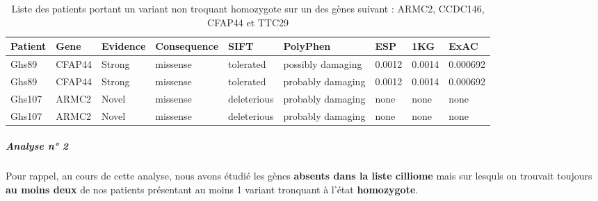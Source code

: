 \documentclass[12pt,twoside]{reedthesis}
\theoremstyle{definition}
\theoremstyle{definition}
\theoremstyle{remark}
\begin{document}
  \begin{longtable}[t]{lllllllll}
  \caption{\label{tab:tabgrp1moderate}Liste des patients portant un variant non troquant homozygote sur un des gènes suivant : ARMC2, CCDC146, CFAP44  et  TTC29}\\
  \toprule
  Patient & Gene & Evidence & Consequence & SIFT & PolyPhen & ESP & 1KG & ExAC\\
  \midrule
  Ghs89 & CFAP44 & Strong & missense & tolerated & possibly damaging & 0.0012 & 0.0014 & 0.000692\\
  Ghs89 & CFAP44 & Strong & missense & tolerated & probably damaging & 0.0012 & 0.0014 & 0.000692\\
  Ghs107 & ARMC2 & Novel & missense & deleterious & probably damaging & none & none & none\\
  Ghs107 & ARMC2 & Novel & missense & deleterious & probably damaging & none & none & none\\
  \bottomrule
  \end{longtable}
  
  \newpage
  
  \subparagraph{Analyse n° 2}\label{analyse-n-2}
  
  Pour rappel, au cours de cette analyse, nous avons étudié les gènes
  \textbf{absents dans la liste cilliome} mais sur lesquls on trouvait
  toujours \textbf{au moins deux} de nos patients présentant au moins 1
  variant tronquant à l'état \textbf{homozygote}.
  
\end{document}
